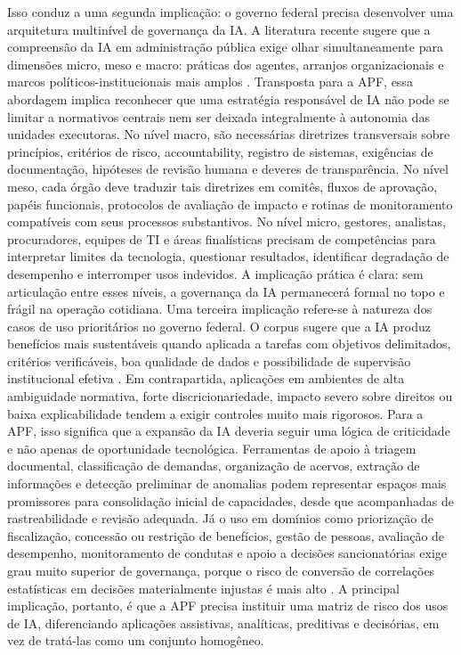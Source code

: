 \documentclass[12pt,a4paper]{article}
\begin{document}
Isso conduz a uma segunda implicação: o governo federal precisa desenvolver uma arquitetura multinível de governança da IA. A literatura recente sugere que a compreensão da IA em administração pública exige olhar simultaneamente para dimensões micro, meso e macro: práticas dos agentes, arranjos organizacionais e marcos políticos-institucionais mais amplos \autocite{criado2024artificial}. Transposta para a APF, essa abordagem implica reconhecer que uma estratégia responsável de IA não pode se limitar a normativos centrais nem ser deixada integralmente à autonomia das unidades executoras. No nível macro, são necessárias diretrizes transversais sobre princípios, critérios de risco, accountability, registro de sistemas, exigências de documentação, hipóteses de revisão humana e deveres de transparência. No nível meso, cada órgão deve traduzir tais diretrizes em comitês, fluxos de aprovação, papéis funcionais, protocolos de avaliação de impacto e rotinas de monitoramento compatíveis com seus processos substantivos. No nível micro, gestores, analistas, procuradores, equipes de TI e áreas finalísticas precisam de competências para interpretar limites da tecnologia, questionar resultados, identificar degradação de desempenho e interromper usos indevidos. A implicação prática é clara: sem articulação entre esses níveis, a governança da IA permanecerá formal no topo e frágil na operação cotidiana.
Uma terceira implicação refere-se à natureza dos casos de uso prioritários no governo federal. O corpus sugere que a IA produz benefícios mais sustentáveis quando aplicada a tarefas com objetivos delimitados, critérios verificáveis, boa qualidade de dados e possibilidade de supervisão institucional efetiva \autocite{parycek2023artificial} \autocite{pi2021machine}. Em contrapartida, aplicações em ambientes de alta ambiguidade normativa, forte discricionariedade, impacto severo sobre direitos ou baixa explicabilidade tendem a exigir controles muito mais rigorosos. Para a APF, isso significa que a expansão da IA deveria seguir uma lógica de criticidade e não apenas de oportunidade tecnológica. Ferramentas de apoio à triagem documental, classificação de demandas, organização de acervos, extração de informações e detecção preliminar de anomalias podem representar espaços mais promissores para consolidação inicial de capacidades, desde que acompanhadas de rastreabilidade e revisão adequada. Já o uso em domínios como priorização de fiscalização, concessão ou restrição de benefícios, gestão de pessoas, avaliação de desempenho, monitoramento de condutas e apoio a decisões sancionatórias exige grau muito superior de governança, porque o risco de conversão de correlações estatísticas em decisões materialmente injustas é mais alto \autocite{krtner2021predictive} \autocite{cho2023human} \autocite{barros2025inteligencia}. A principal implicação, portanto, é que a APF precisa instituir uma matriz de risco dos usos de IA, diferenciando aplicações assistivas, analíticas, preditivas e decisórias, em vez de tratá-las como um conjunto homogêneo.
\end{document}
